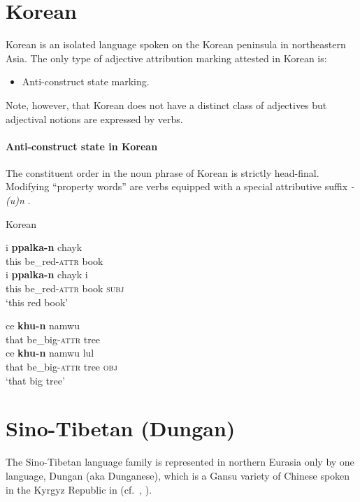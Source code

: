 \section{Korean}
Korean is an isolated language spoken on the Korean peninsula in northeastern Asia. The only type of adjective attribution marking attested in Korean is:
\begin{itemize}
\item Anti-construct state marking.
\end{itemize}
Note, however, that Korean does not have a distinct class of adjectives but adjectival notions are expressed by verbs.

\paragraph{Anti-construct state in Korean}
The constituent order in the noun phrase of Korean is strictly head-final. Modifying “property words” are verbs equipped with a special attributive suffix \textit{-(u)n} \citep{martin-etal1969}.
\begin{exe}
\ex \rm{Korean \citep[61]{chang1996}}
\begin{xlist}
\ex
\begin{xlist}
\ex
\gll	i \textbf{ppalka-n} chayk\\
	this be\_red-\textsc{attr} book\\
\ex	
\gll	i \textbf{ppalka-n} chayk i\\
	this be\_red-\textsc{attr} book \textsc{subj}\\
\glt	‘this red book’
\end{xlist}
\ex
\begin{xlist}
\ex	
\gll	ce \textbf{khu-n} namwu\\
	that be\_big-\textsc{attr} tree\\
\ex
\gll	ce \textbf{khu-n} namwu lul\\
	that be\_big-\textsc{attr} tree \textsc{obj}\\
\glt	‘that big tree’
\end{xlist}
\end{xlist}
\end{exe}

\section{Sino-Tibetan (Dungan)}\label{sinotibetan synchr}
The Sino-Tibetan language family is represented in northern Eurasia only by one language, Dungan (aka Dunganese), which is a Gansu variety of Chinese spoken in the Kyrgyz Republic in  (cf.~\citealt[85]{yuo2003}, \citealt{kalimov1968}).

